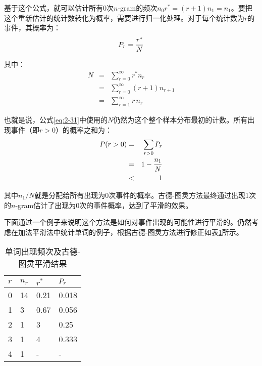 \parinterval 基于这个公式，就可以估计所有0次$n$-gram的频次$n_0 r^*=(r+1)n_1=n_1$。要把这个重新估计的统计数转化为概率，需要进行归一化处理。对于每个统计数为$r$的事件，其概率为：
\begin{eqnarray}
{P}_r=\frac{r^*}{N}
\label{eq:2-30}
\end{eqnarray}

\noindent 其中：
\begin{eqnarray}
N & = & \sum_{r=0}^{\infty}{r^{*}n_r} \nonumber \\
  & = & \sum_{r=0}^{\infty}{(r + 1)n_{r + 1}} \nonumber \\
  & = & \sum_{r=1}^{\infty}{r\,n_r}
\label{eq:2-31}
\end{eqnarray}

\parinterval 也就是说，公式\eqref{eq:2-31}中使用的$N$仍然为这个整个样本分布最初的计数。所有出现事件（即$r > 0$）的概率之和为：
\begin{eqnarray}
{P}(r>0) & = & \sum_{r>0}{{P}_r} \nonumber \\
                & = & 1 - \frac{n_1}{N} \nonumber \\
                & < & 1
\label{eq:2-32}
\end{eqnarray}

\noindent 其中$n_1/N$就是分配给所有出现为0次事件的概率。古德-图灵方法最终通过出现1次的$n$-gram估计了出现为0次的事件概率，达到了平滑的效果。

\parinterval 下面通过一个例子来说明这个方法是如何对事件出现的可能性进行平滑的。仍然考虑在加法平滑法中统计单词的例子，根据古德-图灵方法进行修正如表\ref{tab:2-3}所示。

\begin{table}[htp]{
\begin{center}
\caption{单词出现频次及古德-图灵平滑结果}
{
\begin{tabular}{l|lll}
\rule{0pt}{10pt} $r$ & $n_r$ & $r^*$ & ${P}_r$\\ \hline
\rule{0pt}{10pt} 0 & 14 & 0.21 & 0.018 \\
\rule{0pt}{10pt} 1 & 3 & 0.67 & 0.056 \\
\rule{0pt}{10pt} 2 & 1 & 3 & 0.25 \\
\rule{0pt}{10pt} 3 & 1 & 4 & 0.333 \\
\rule{0pt}{10pt} 4 & 1 & - & - \\
\end{tabular}
\label{tab:2-3}
}
\end{center}
}\end{table}

